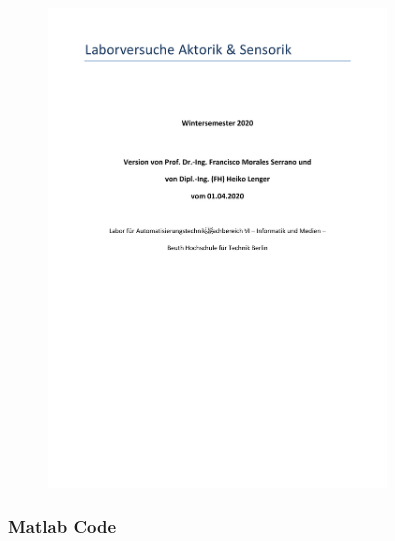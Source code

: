 \begin{figure}[H]
    \centering
    \includegraphics[page=6, width=0.8\textwidth]{../Aufgabenstellung.pdf}
    \label{fig:Aufgabenstellung Labor 2.2}
\end{figure}

\subsubsection{Matlab Code}



